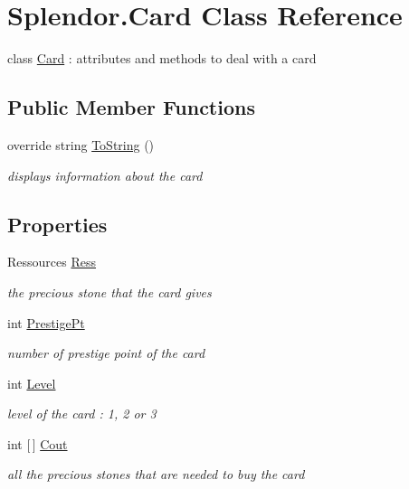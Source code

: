 \hypertarget{class_splendor_1_1_card}{}\section{Splendor.\+Card Class Reference}
\label{class_splendor_1_1_card}


class \mbox{\hyperlink{class_splendor_1_1_card}{Card}} \+: attributes and methods to deal with a card  


\subsection*{Public Member Functions}
\begin{DoxyCompactItemize}
\item 
override string \mbox{\hyperlink{class_splendor_1_1_card_a3403c28ee02b119ee5aae5bd10eee468}{To\+String}} ()
\begin{DoxyCompactList}\small\item\em displays information about the card \end{DoxyCompactList}\end{DoxyCompactItemize}
\subsection*{Properties}
\begin{DoxyCompactItemize}
\item 
Ressources \mbox{\hyperlink{class_splendor_1_1_card_afcfaa7ea5072b3cd30c04adddc8dd5c7}{Ress}}
\begin{DoxyCompactList}\small\item\em the precious stone that the card gives \end{DoxyCompactList}\item 
int \mbox{\hyperlink{class_splendor_1_1_card_a117119ceac083b7b7d39f11e5bbd7225}{Prestige\+Pt}}
\begin{DoxyCompactList}\small\item\em number of prestige point of the card \end{DoxyCompactList}\item 
int \mbox{\hyperlink{class_splendor_1_1_card_aadc9953aeb322c82e04fbd9b5a3b996d}{Level}}
\begin{DoxyCompactList}\small\item\em level of the card \+: 1, 2 or 3 \end{DoxyCompactList}\item 
int \mbox{[}$\,$\mbox{]} \mbox{\hyperlink{class_splendor_1_1_card_af3c65d4d543f453d5c481682233745c7}{Cout}}
\begin{DoxyCompactList}\small\item\em all the precious stones that are needed to buy the card \end{DoxyCompactList}\end{DoxyCompactItemize}


